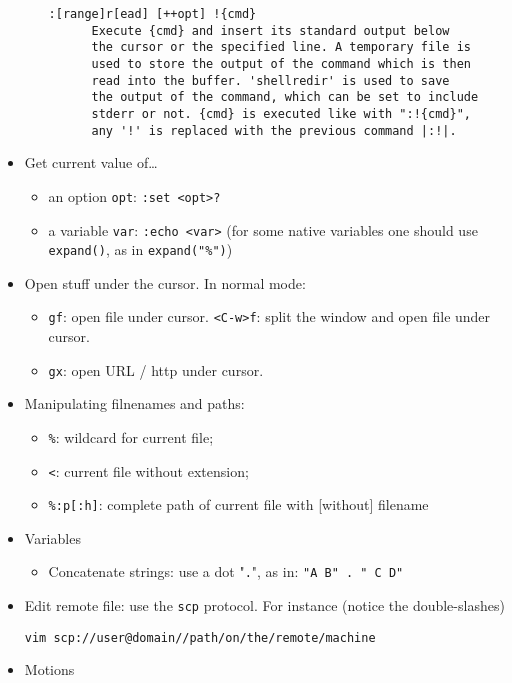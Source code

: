 \documentclass[a4paper,12pt,%
              final%
              ]{article}
\begin{document}
\begin{itemize}
\begin{itemize}
\begin{verbatim}
:[range]r[ead] [++opt] !{cmd}
      Execute {cmd} and insert its standard output below
      the cursor or the specified line. A temporary file is
      used to store the output of the command which is then
      read into the buffer. 'shellredir' is used to save
      the output of the command, which can be set to include
      stderr or not. {cmd} is executed like with ":!{cmd}",
      any '!' is replaced with the previous command |:!|.
\end{verbatim}
    \end{itemize}
  \item Get current value of\ldots
    \begin{itemize}
      \item an option \verb|opt|: \verb|:set <opt>?|
      \item a variable \verb|var|: \verb|:echo <var>| (for some native variables one should use \verb|expand()|, as in \verb|expand("%")|)
    \end{itemize}
  \item Open stuff under the cursor. In normal mode:
    \begin{itemize}
      \item \texttt{gf}: open file under cursor. \texttt{<C-w>f}: split the window
        and open file under cursor.
      \item \texttt{gx}: open URL / http under cursor.
    \end{itemize}
  \item Manipulating filnenames and paths:
    \begin{itemize}
      \item \verb|%|: wildcard for current file;
      \item \verb|<|: current file without extension;
      \item \verb|%:p[:h]|: complete path of current file with [without] filename
    \end{itemize}
  \item Variables
    \begin{itemize}
      \item Concatenate strings: use a dot "\texttt{.}", as in: \verb|"A B" . " C D"|
    \end{itemize}
  \item Edit remote file: use the \texttt{scp} protocol. For instance (notice the
    double-slashes)
\begin{verbatim}
vim scp://user@domain//path/on/the/remote/machine
\end{verbatim}
  \item Motions

\end{itemize}
\end{document}
